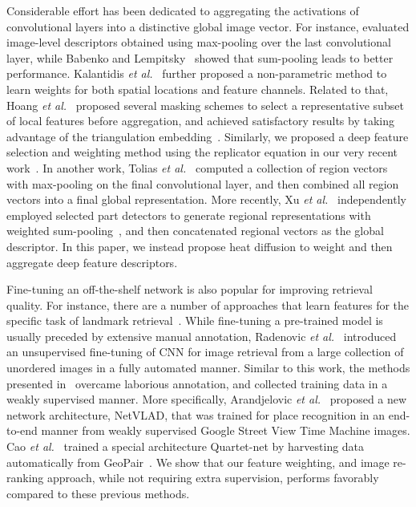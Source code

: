 \documentclass[journal]{IEEEtran}
\begin{document}
Considerable effort has been dedicated to aggregating the activations of convolutional layers into a distinctive global image vector.
For instance, \cite{azizpour2015generic,razavian2016visual} evaluated image-level descriptors obtained using max-pooling over the last convolutional layer, while Babenko and Lempitsky~\cite{babenko2015aggregating} showed that sum-pooling leads to better performance.
Kalantidis \textit{et al.}~\cite{kalantidis2016cross} further proposed a non-parametric method to learn weights for both spatial locations and feature channels.
Related to that, Hoang \textit{et al.}~\cite{hoang2017selective} proposed several masking schemes to select a representative subset of local features before aggregation,
and achieved satisfactory results by taking advantage of the triangulation embedding~\cite{jegou2014triangulation}.
Similarly, we proposed a deep feature selection and weighting method using the replicator equation in our very recent work~\cite{pang2018building}.
In another work, Tolias \textit{et al.}~\cite{tolias2016particular} computed a collection of region vectors with max-pooling on the final convolutional layer, and then combined all region vectors into a final global representation.
More recently, Xu \textit{et al.}~\cite{xu2018unsupervised} independently employed selected part detectors to generate regional representations with weighted sum-pooling~\cite{kalantidis2016cross}, and then concatenated regional vectors as the global descriptor. In this paper, we instead propose heat diffusion to weight and then aggregate deep feature descriptors.

Fine-tuning an off-the-shelf network is also popular for improving retrieval quality.
For instance, there are a number of approaches that learn features for the specific task of landmark retrieval~\cite{radenovic2016cnn,gordo2016deep,arandjelovic2016netvlad,cao2016quartet}.
While fine-tuning a pre-trained model is usually preceded by extensive manual annotation,
Radenovic \textit{et al.}~\cite{radenovic2016cnn} introduced an unsupervised fine-tuning of CNN for image retrieval from a large collection of unordered images in a fully automated manner.
Similar to this work, the methods presented in~\cite{arandjelovic2016netvlad,cao2016quartet} overcame laborious annotation, and collected training data in a weakly supervised manner.
More specifically, Arandjelovic \textit{et al.}~\cite{arandjelovic2016netvlad} proposed a new network architecture, NetVLAD, that was trained for place recognition in an end-to-end manner from weakly supervised Google Street View Time Machine images. Cao \textit{et al.}~\cite{cao2016quartet} trained a special architecture Quartet-net by harvesting data automatically from GeoPair~\cite{thomee2016yfcc100m}. We show that our feature weighting, and image re-ranking approach, while not requiring extra supervision, performs favorably compared to these previous methods.
\end{document}
